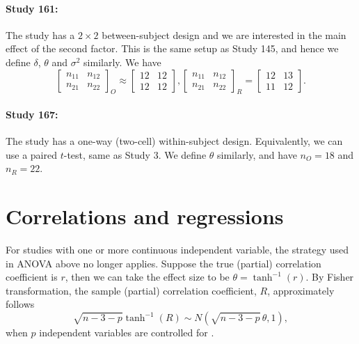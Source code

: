 \documentclass[11pt]{article}
\theoremstyle{definition}
\theoremstyle{custom}
\begin{document}
  \paragraph{Study 161: \citet{LoBue:2008cn}}

  The study has a $2 \times 2$ between-subject design and we are interested in the main effect of the second factor. This is the same setup as Study 145, and hence we define $\delta$, $\theta$ and $\sigma^2$ similarly. We have 
  \[
  \begin{bmatrix}
  n_{11} & n_{12} \\
  n_{21} & n_{22}
  \end{bmatrix}_O \approx \begin{bmatrix}
  12 & 12 \\
  12 & 12
  \end{bmatrix}, \begin{bmatrix}
  n_{11} & n_{12} \\
  n_{21} & n_{22}
  \end{bmatrix}_R = \begin{bmatrix}
  12 & 13 \\
  11 & 12
  \end{bmatrix}.
  \]

  \paragraph{Study 167: \citet{Estes:2008ci}}
  The study has a one-way (two-cell) within-subject design. Equivalently, we can use a paired $t$-test, same as Study 3. We define $\theta$ similarly, and have $n_O = 18$ and $n_R = 22$.

\section{Correlations and regressions}
  
  For studies with one or more continuous independent variable, the strategy used in ANOVA above no longer applies. Suppose the true (partial) correlation coefficient is $r$, then we can take the effect size to be $\theta = \tanh^{-1}(r)$. By Fisher transformation, the sample (partial) correlation coefficient, $R$, approximately follows
  \[
    \sqrt{n-3-p} \tanh^{-1}(R) \sim N(\sqrt{n-3-p} \,\theta, 1),
    \]
  when $p$ independent variables are controlled for \citep{Fisher:1924ve}.
\end{document}
